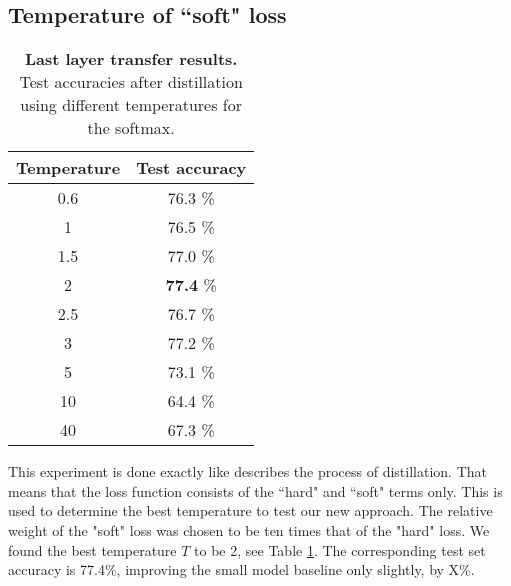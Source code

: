 \documentclass[10pt,twocolumn,letterpaper]{article}
\begin{document}
\subsection{Temperature of ``soft" loss}
\begin{table}[]
	\begin{center}
	\begin{tabular}{|c|c|}
		\hline
		Temperature	&	Test accuracy	\\ \hline
		0.6			&	76.3 \%			\\ \hline
		1			&	76.5 \%			\\ \hline
		1.5			&	77.0 \%			\\ \hline
		2			&	\textbf{77.4} \%\\ \hline
		2.5			&	76.7 \%			\\ \hline
		3			&	77.2 \%			\\ \hline
		5			&	73.1 \%			\\ \hline
		10			&	64.4 \%			\\ \hline
		40			&	67.3 \%			\\ \hline
	\end{tabular}
	\end{center}
	\caption{\textbf{Last layer transfer results.} Test accuracies after distillation using different temperatures for the softmax.}
	\label{tab:LL_results}
\end{table}

This experiment is done exactly like \cite{hinton2015distilling} describes the process of distillation. That means that the loss function consists of the ``hard" and ``soft" terms only. This is used to determine the best temperature to test our new approach. The relative weight of the "soft" loss was chosen to be ten times that of the "hard" loss. We found the best temperature $ T $ to be 2, see Table \ref{tab:LL_results}. The corresponding test set accuracy is 77.4\%, improving the small model baseline only slightly, by X\%.
\end{document}
